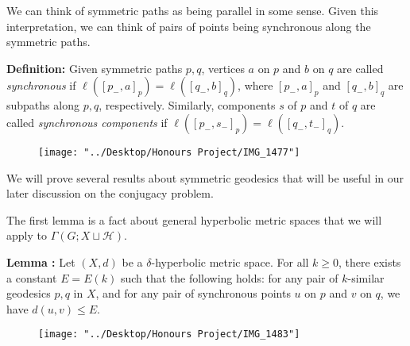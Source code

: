 \documentclass[12pt]{article}
\newcommand{\vs}{\vskip10pt}
\begin{document}
	\vs 
	
	We can think of symmetric paths as being parallel in some sense. Given this interpretation, we can think of pairs of points being synchronous along the symmetric paths. 
	
	\vs 
	
	\textbf{Definition: } Given symmetric paths $p,q$, vertices $a$ on $p$ and $b$ on $q$ are called \textit{synchronous} if $\ell([p_{-}, a]_p) = \ell([q_{-}, b]_q)$, where $[p_{-}, a]_p$ and $[q_{-}, b]_q$ are subpaths along $p,q$, respectively. Similarly, components $s$ of $p$ and $t$ of $q$ are called \textit{synchronous components} if $\ell([p_{-}, s_{-}]_p) = \ell([q_{-}, t_{-}]_q)$. 
	
\begin{figure} [h]
	\centering
	\texttt{[image: "../Desktop/Honours Project/IMG\_1477"]}
	\caption{}
	\label{fig:img1477}
\end{figure}
	
	\vs 
	
	We will prove several results about symmetric geodesics that will be useful in our later discussion on the conjugacy problem. 
	
	\vs 
	
	The first lemma is a fact about general hyperbolic metric spaces that we will apply to $\Gamma(G; X \sqcup \mathcal{H})$. 
	
	\vs 
	
	\textbf{Lemma : } Let $(X,d)$ be a $\delta$-hyperbolic metric space. For all $k \geq 0$, there exists a constant $E = E(k)$ such that the following holds: for any pair of $k$-similar geodesics $p,q$ in $X$, and for any pair of synchronous points $u$ on $p$ and $v$ on $q$, we have $d(u,v) \leq E$. 
	
\begin{figure}
	\centering
	\texttt{[image: "../Desktop/Honours Project/IMG\_1483"]}
	\caption{}
	\label{fig:img1483}
\end{figure}
	
\end{document}
